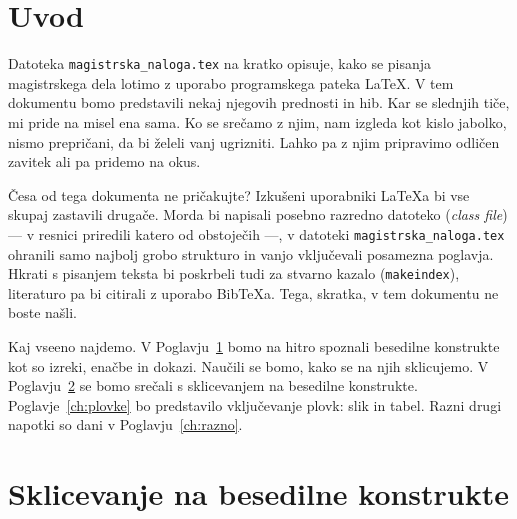 \documentclass[a4paper, 12pt]{book}
\newcommand{\BibTeX}{{\sc Bib}\TeX}
\begin{document}
\chapter{Uvod}
\label{ch:uvod}

Datoteka {\tt magistrska\_naloga.tex} na kratko opisuje, kako se pisanja magistrskega dela lotimo z uporabo programskega pateka \LaTeX. V tem dokumentu bomo predstavili nekaj njegovih prednosti in hib. Kar se slednjih tiče, mi pride na misel ena sama. Ko se srečamo z njim, nam izgleda kot kislo jabolko, nismo prepričani, da bi želeli vanj ugrizniti. Lahko pa z njim pripravimo odličen zavitek ali pa pridemo na okus.

Česa od tega dokumenta ne pričakujte? Izkušeni uporabniki \LaTeX{}a bi vse skupaj zastavili
drugače. Morda bi napisali posebno razredno datoteko (\emph{class file}) --- v resnici priredili katero od obstoječih ---, v datoteki {\tt magistrska\_naloga.tex} ohranili samo najbolj grobo strukturo in vanjo vključevali  posamezna po\-glav\-ja. Hkrati s pisanjem teksta bi poskrbeli tudi za stvarno kazalo ({\tt makeindex}), literaturo pa bi citirali z uporabo {\BibTeX}{a}. Tega, skratka, v tem dokumentu ne boste našli.

Kaj vseeno najdemo. V Poglavju~\ref{ch:uvod} bomo na hitro spoznali besedilne konstrukte kot so izreki, enačbe in dokazi. Naučili se bomo, kako se na njih sklicujemo. V Poglavju~\ref{ch:sklicevanje} se bomo srečali s sklicevanjem na besedilne konstrukte. Poglavje~\ref{ch:plovke} bo predstavilo vključevanje plovk: slik in tabel.
Razni drugi napotki so dani v Poglavju~\ref{ch:razno}.

\chapter{Sklicevanje na besedilne konstrukte}
\label{ch:sklicevanje}
\end{document}
